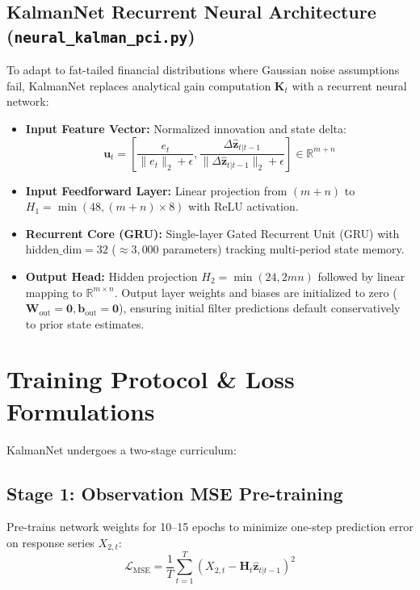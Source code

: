 \documentclass[11pt, a4paper]{article}
\begin{document}
\subsection{KalmanNet Recurrent Neural Architecture (\texttt{neural\_kalman\_pci.py})}
To adapt to fat-tailed financial distributions where Gaussian noise assumptions fail, KalmanNet replaces analytical gain computation $\mathbf{K}_t$ with a recurrent neural network:
\begin{itemize}
    \item \textbf{Input Feature Vector:} Normalized innovation and state delta:
    \begin{equation}
        \mathbf{u}_t = \left[ \frac{e_t}{\|e_t\|_2 + \epsilon}, \frac{\Delta \hat{\mathbf{z}}_{t|t-1}}{\|\Delta \hat{\mathbf{z}}_{t|t-1}\|_2 + \epsilon} \right] \in \mathbb{R}^{m + n}
    \end{equation}
    \item \textbf{Input Feedforward Layer:} Linear projection from $(m+n)$ to $H_1 = \min(48, (m+n)\times 8)$ with ReLU activation.
    \item \textbf{Recurrent Core (GRU):} Single-layer Gated Recurrent Unit (GRU) with $\text{hidden\_dim} = 32$ ($\approx 3,000$ parameters) tracking multi-period state memory.
    \item \textbf{Output Head:} Hidden projection $H_2 = \min(24, 2mn)$ followed by linear mapping to $\mathbb{R}^{m \times n}$. Output layer weights and biases are initialized to zero ($\mathbf{W}_{\text{out}} = \mathbf{0}, \mathbf{b}_{\text{out}} = \mathbf{0}$), ensuring initial filter predictions default conservatively to prior state estimates.
\end{itemize}

\section{Training Protocol \& Loss Formulations}

KalmanNet undergoes a two-stage curriculum:

\subsection{Stage 1: Observation MSE Pre-training}
Pre-trains network weights for 10--15 epochs to minimize one-step prediction error on response series $X_{2,t}$:
\begin{equation}
    \mathcal{L}_{\text{MSE}} = \frac{1}{T} \sum_{t=1}^T \left( X_{2,t} - \mathbf{H}_t \hat{\mathbf{z}}_{t|t-1} \right)^2
\end{equation}
\end{document}
